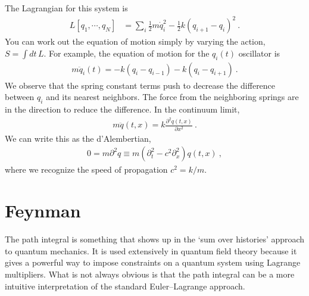 The Lagrangian  for this system is
\begin{align}
    L[q_1,\cdots, q_N]
    &= 
    \sum_i \frac{1}{2} m \dot q_i^2 - \frac{1}{2}k (q_{i+1}-q_i)^2 \ .
\end{align}
You can work out the equation of motion simply by varying the action, $S=\int dt\,L$. For example, the equation of motion for the $q_i(t)$ oscillator is
\begin{align}
    m\ddot{q}_i(t) = -k(q_{i}-q_{i-1}) -k(q_{i}-q_{i+1}) \ .
\end{align}
We observe that the spring constant terms push to decrease the difference between $q_i$ and its nearest neighbors. The force from the neighboring springs are in the direction to reduce the difference. In the continuum limit,
\begin{align}
    m\ddot{q}(t,x) = k\frac{\partial^2{q(t,x)}}{\partial{x}^2} \ .
\end{align}
We can write this as the d'Alembertian,
\begin{align}
    0 = m \partial^2 q \equiv m\left(\partial_t^2 - c^2 \partial_x^2\right) q(t,x) \ ,
\end{align}
where we recognize the speed of propagation $c^2 = k/m$.





\section{Feynman}

The path integral is something that shows up in the `sum over histories' approach to quantum mechanics. It is used extensively in quantum field theory because it gives a powerful way to impose constraints on a quantum system using Lagrange multipliers. What is not always obvious is that the path integral can be a more intuitive interpretation of the standard Euler--Lagrange approach. 

